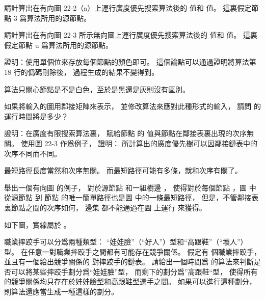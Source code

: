 \startsection[
  title={Breadth-first search},
]

\startEXERCISE
請計算出在有向圖 22-2（a）上運行廣度優先搜索算法後的  值和 \m{\phi} 值。
這裏假定節點 3 爲算法所用的源節點。
\stopEXERCISE

\startANSWER
{}
\stopANSWER

\startEXERCISE
請計算出在有向圖 22-3 所示無向圖上運行廣度優先搜索算法後的  值和 \m{\phi} 值。
這裏假定節點 u 爲算法所用的源節點。
\stopEXERCISE

\startANSWER
{}
\stopANSWER

\startEXERCISE
證明：使用單個位來存放每個節點的顏色即可。
這個論點可以通過證明將算法第 18 行的僞碼刪除後，  過程生成的結果不變得到。
\stopEXERCISE

\startANSWER
算法只關心節點是不是白色，至於是黑還是灰則沒有區別。
\stopANSWER

\startEXERCISE
如果將輸入的圖用鄰接矩陣來表示，
並修改算法來應對此種形式的輸入，
請問  的運行時間將是多少？
\stopEXERCISE

\startANSWER
{}
\stopANSWER

\startEXERCISE
證明：在廣度有限搜索算法裏，
賦給節點  的  值與節點在鄰接表裏出現的次序無關。
使用圖 22-3 作爲例子，
證明：  所計算出的廣度優先樹可以因鄰接鏈表中的次序不同而不同。
\stopEXERCISE

\startANSWER
最短路徑長度當然和次序無關。
而最短路徑可能有多條，就和次序有關了。
\stopANSWER

\startEXERCISE
舉出一個有向圖  的例子，
對於源節點  和一組樹邊 ，
使得對於每個節點 ，圖  中從源節點  到
節點  的唯一簡單路徑也是圖  中的一條最短路徑，
但是，不管鄰接表裏節點之間的次序如何，
邊集  都不能通過在圖  上運行  來獲得。
\stopEXERCISE

\startANSWER
如下圖，實線屬於 。

\externalfigure[output/e22_2_6-1]
\stopANSWER

\startEXERCISE
職業摔跤手可以分爲兩種類型：
“娃娃臉”（“好人”）型和“高跟鞋”（“壞人”）型。
在任意一對職業摔跤手之間都有可能存在競爭關係。
假定有  個職業摔跤手，
並且有一個給出競爭關係的  對摔跤手的鏈表。
請給出一個時間爲  的算法來判斷是否可以將某些摔跤手劃分爲“娃娃臉”型，
而剩下的劃分爲”高跟鞋“型，
使得所有的競爭關係均只存在於娃娃臉型和高跟鞋型選手之間。
如果可以進行這種劃分，
則算法還應當生成一種這樣的劃分。
\stopEXERCISE

